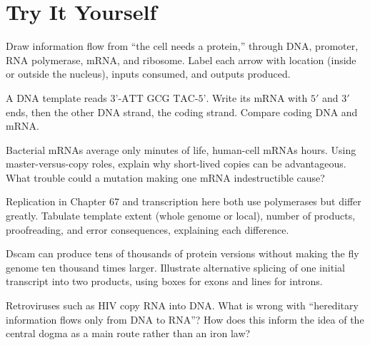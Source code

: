 \section*{Try It Yourself}

\begin{sikaoti}
\item Draw information flow from ``the cell needs a protein,'' through DNA, promoter, RNA polymerase, mRNA, and ribosome. Label each arrow with location (inside or outside the nucleus), inputs consumed, and outputs produced.
\item A DNA template reads $\text{3'-ATT GCG TAC-5'}$. Write its mRNA with $5'$ and $3'$ ends, then the other DNA strand, the coding strand. Compare coding DNA and mRNA.
\item Bacterial mRNAs average only minutes of life, human-cell mRNAs hours. Using master-versus-copy roles, explain why short-lived copies can be advantageous. What trouble could a mutation making one mRNA indestructible cause?
\item Replication in Chapter 67 and transcription here both use polymerases but differ greatly. Tabulate template extent (whole genome or local), number of products, proofreading, and error consequences, explaining each difference.
\item Dscam can produce tens of thousands of protein versions without making the fly genome ten thousand times larger. Illustrate alternative splicing of one initial transcript into two products, using boxes for exons and lines for introns.
\item Retroviruses such as HIV copy RNA into DNA. What is wrong with ``hereditary information flows only from DNA to RNA''? How does this inform the idea of the central dogma as a main route rather than an iron law?
\end{sikaoti}
